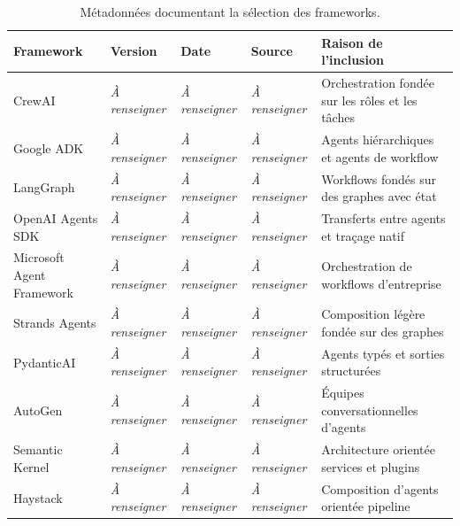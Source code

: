 \begin{table}[t]
    \centering
    \caption{Métadonnées documentant la sélection des frameworks.}
    \label{tab:metadonnees-frameworks}
    \small
    \begin{tabular}{
        @{}
        p{}
        p{}
        p{}
        p{}
        p{}
        @{}
    }
        \hline
        \textbf{Framework}
        & \textbf{Version}
        & \textbf{Date}
        & \textbf{Source}
        & \textbf{Raison de l'inclusion} \\
        \hline

        CrewAI
        & \emph{À renseigner}
        & \emph{À renseigner}
        & \emph{À renseigner}
        & Orchestration fondée sur les rôles et les tâches \\

        Google ADK
        & \emph{À renseigner}
        & \emph{À renseigner}
        & \emph{À renseigner}
        & Agents hiérarchiques et agents de workflow \\

        LangGraph
        & \emph{À renseigner}
        & \emph{À renseigner}
        & \emph{À renseigner}
        & Workflows fondés sur des graphes avec état \\

        OpenAI Agents SDK
        & \emph{À renseigner}
        & \emph{À renseigner}
        & \emph{À renseigner}
        & Transferts entre agents et traçage natif \\

        Microsoft Agent Framework
        & \emph{À renseigner}
        & \emph{À renseigner}
        & \emph{À renseigner}
        & Orchestration de workflows d'entreprise \\

        Strands Agents
        & \emph{À renseigner}
        & \emph{À renseigner}
        & \emph{À renseigner}
        & Composition légère fondée sur des graphes \\

        PydanticAI
        & \emph{À renseigner}
        & \emph{À renseigner}
        & \emph{À renseigner}
        & Agents typés et sorties structurées \\

        AutoGen
        & \emph{À renseigner}
        & \emph{À renseigner}
        & \emph{À renseigner}
        & Équipes conversationnelles d'agents \\

        Semantic Kernel
        & \emph{À renseigner}
        & \emph{À renseigner}
        & \emph{À renseigner}
        & Architecture orientée services et plugins \\

        Haystack
        & \emph{À renseigner}
        & \emph{À renseigner}
        & \emph{À renseigner}
        & Composition d'agents orientée pipeline \\

        \hline
    \end{tabular}
\end{table}


